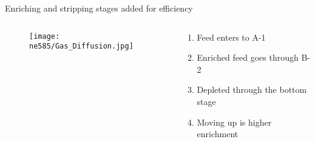 \documentclass[aspectratio=1610,pdftex,dvipsnames,compress,xcolor={dvipsnames}]{beamer}
\begin{document}
\begin{frame}{Enriching and stripping stages added for efficiency}
    \begin{columns}

        \begin{column}{0.40\textwidth}
            \begin{figure}
                \centering
                \texttt{[image: ne585/Gas\_Diffusion.jpg]}
            \end{figure}
        \end{column}

        \begin{column}{0.60\textwidth}
            \begin{enumerate}[series=outerlist,topsep=0pt,itemsep=21pt,leftmargin=*,label=(\arabic*)]
                \item[]Feed enters to A-1
                \item[]Enriched feed goes through B-2
                \item[]Depleted through the bottom stage
                \item[]Moving up is higher enrichment
            \end{enumerate}
        \end{column}

    \end{columns}
\end{frame}
\end{document}
